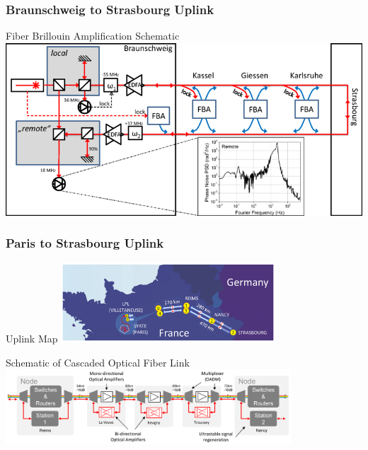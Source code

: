 \documentclass{beamer}
\begin{document}
\begin{frame}\frametitle{Braunschweig to Strasbourg Uplink}
    \begin{block}{Fiber Brillouin Amplification Schematic}
        \centering
        \includegraphics[width=1.0\textwidth,keepaspectratio]{Images/PTB_Loop_Schem.png}
    \end{block}
    
    \cite{Raupach2015}
\end{frame}

\begin{frame}\frametitle{Paris to Strasbourg Uplink}
    \begin{block}{Uplink Map}
        \centering
        \includegraphics[width=0.6\textwidth,keepaspectratio]{Images/SYRTE_Link_Map.jpg}
    \end{block}

    \begin{block}{Schematic of Cascaded Optical Fiber Link}
        \centering
        \includegraphics[width=0.8\textwidth,keepaspectratio]{Images/SYRTE_Link_Schem.jpg}
    \end{block}

    \cite{Chiodo2015}
\end{frame}
\end{document}
